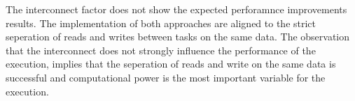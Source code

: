 The interconnect factor does not show the expected perforamnce improvements results. The implementation of both approaches are aligned to the strict seperation of reads and writes between tasks on the same data. The observation that the interconnect does not strongly influence the performance of the execution, implies that the seperation of reads and write on the same data is successful and computational power is the most important variable for the execution.




